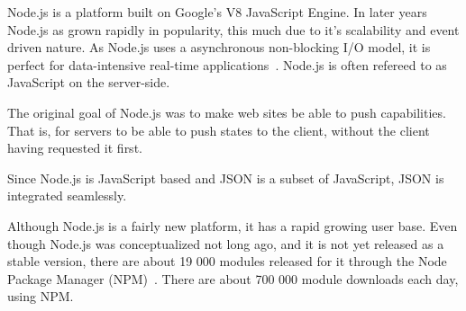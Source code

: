Node.js is a platform built on Google's V8 JavaScript Engine. In later years Node.js as grown rapidly in popularity, this much due to it's scalability and event driven nature. As Node.js uses a asynchronous non-blocking I/O model, it is perfect for data-intensive real-time applications~\citep{site:nodejs}. Node.js is often refereed to as JavaScript on the server-side. 

The original goal of Node.js was to make web sites be able to push capabilities. That is, for servers to be able to push states to the client, without the client having requested it first. 

Since Node.js is JavaScript based and JSON is a subset of JavaScript, JSON is integrated seamlessly. 

Although Node.js is a fairly new platform, it has a rapid growing user base. Even though Node.js was conceptualized not long ago, and it is not yet released as a stable version, there are about 19 000 modules released for it through the Node Package Manager (NPM)~\citep{site:npm}. There are about 700 000 module downloads each day, using NPM. 
